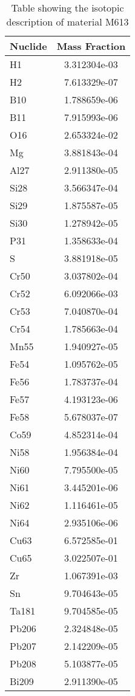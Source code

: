 \begin{centering}
\begin{table}[ht!]
\begin{tabular}{l | c}
\hline
Nuclide & Mass Fraction\\
\hline
H1 & 3.312304e-03\\
H2 & 7.613329e-07\\
B10 & 1.788659e-06\\
B11 & 7.915993e-06\\
O16 & 2.653324e-02\\
Mg & 3.881843e-04\\
Al27 & 2.911380e-05\\
Si28 & 3.566347e-04\\
Si29 & 1.875587e-05\\
Si30 & 1.278942e-05\\
P31 & 1.358633e-04\\
S & 3.881918e-05\\
Cr50 & 3.037802e-04\\
Cr52 & 6.092066e-03\\
Cr53 & 7.040870e-04\\
Cr54 & 1.785663e-04\\
Mn55 & 1.940927e-05\\
Fe54 & 1.095762e-05\\
Fe56 & 1.783737e-04\\
Fe57 & 4.193123e-06\\
Fe58 & 5.678037e-07\\
Co59 & 4.852314e-04\\
Ni58 & 1.956384e-04\\
Ni60 & 7.795500e-05\\
Ni61 & 3.445201e-06\\
Ni62 & 1.116461e-05\\
Ni64 & 2.935106e-06\\
Cu63 & 6.572585e-01\\
Cu65 & 3.022507e-01\\
Zr & 1.067391e-03\\
Sn & 9.704643e-05\\
Ta181 & 9.704585e-05\\
Pb206 & 2.324848e-05\\
Pb207 & 2.142209e-05\\
Pb208 & 5.103877e-05\\
Bi209 & 2.911390e-05
\end{tabular}
\caption{Table showing the isotopic description of material M613}
\label{table:material_M613}
\end{table}\clearpage


\end{centering}
